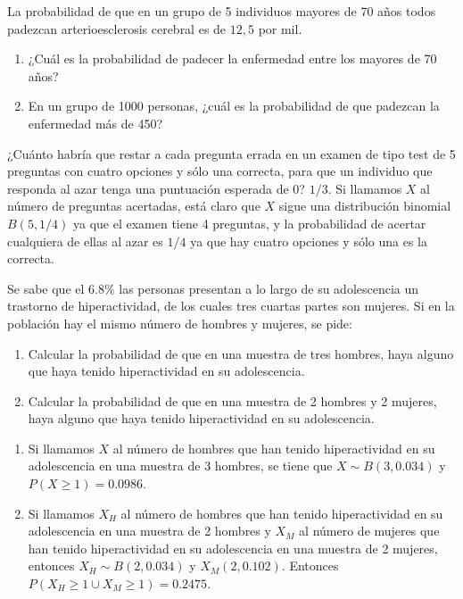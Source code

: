 {La probabilidad de que en un grupo de 5 individuos mayores de 70 años todos padezcan arterioesclerosis cerebral es de $12,5$ por mil.
\begin{enumerate}
\item ¿Cuál es la probabilidad de padecer la enfermedad entre los mayores de 70 años?
\item En un grupo de 1000 personas, ¿cuál es la probabilidad de que padezcan la enfermedad más de 450?
\end{enumerate}
}
{}
{}


{¿Cuánto habría que restar a cada pregunta errada en un examen de tipo test de 5 preguntas con cuatro opciones y sólo
una correcta, para que un individuo que responda al azar tenga una puntuación esperada de 0? 
}
{$1/3$.}
{Si llamamos $X$ al número de preguntas acertadas, está claro que $X$ sigue una distribución binomial $B(5,1/4)$ ya
que el examen tiene 4 preguntas, y la probabilidad de acertar cualquiera de ellas al azar es $1/4$ ya que hay cuatro
opciones y sólo una es la correcta.
}


{Se sabe que el $6.8$\% las personas presentan a lo largo de su adolescencia un trastorno de hiperactividad, de los
cuales tres cuartas partes son mujeres.
Si en la población hay el mismo número de hombres y mujeres, se pide:
\begin{enumerate}
\item Calcular la probabilidad de que en una muestra de tres hombres, haya alguno que haya tenido hiperactividad en su
adolescencia. 
\item Calcular la probabilidad de que en una muestra de 2 hombres y 2 mujeres, haya alguno que haya tenido
hiperactividad en su adolescencia. 
\end{enumerate}
}
{
\begin{enumerate}
\item Si llamamos $X$ al número de hombres que han tenido hiperactividad en su adolescencia en una muestra de 3
hombres, se tiene que $X\sim B(3,0.034)$ y $P(X\geq 1)=0.0986$.
\item Si llamamos $X_H$ al número de hombres que han tenido hiperactividad en su adolescencia en una muestra de 2
hombres y $X_M$ al número de mujeres que han tenido hiperactividad en su adolescencia en una muestra de 2 mujeres,
entonces $X_H\sim B(2,0.034)$ y $X_M(2,0.102)$. Entonces $P(X_H\geq 1\cup X_M\geq 1)=0.2475$.
\end{enumerate}
}
{}


